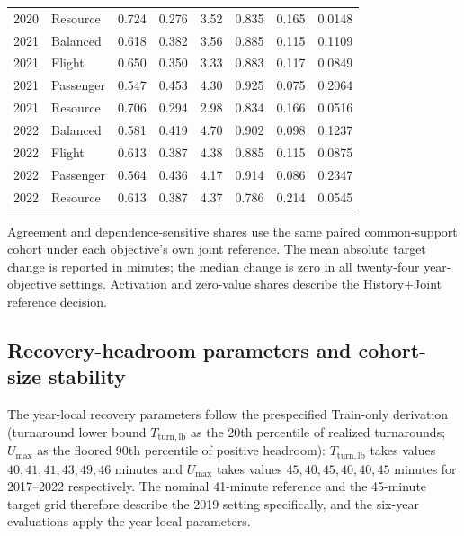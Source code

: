 \documentclass[10pt,a4paper]{article}
\numberwithin{equation}{section}
\begin{document}
\begin{table}[htbp]
\begin{tabular}{llrrrrrr}
2020 & Resource & 0.724 & 0.276 & 3.52 & 0.835 & 0.165 & 0.0148 \\
2021 & Balanced & 0.618 & 0.382 & 3.56 & 0.885 & 0.115 & 0.1109 \\
2021 & Flight & 0.650 & 0.350 & 3.33 & 0.883 & 0.117 & 0.0849 \\
2021 & Passenger & 0.547 & 0.453 & 4.30 & 0.925 & 0.075 & 0.2064 \\
2021 & Resource & 0.706 & 0.294 & 2.98 & 0.834 & 0.166 & 0.0516 \\
2022 & Balanced & 0.581 & 0.419 & 4.70 & 0.902 & 0.098 & 0.1237 \\
2022 & Flight & 0.613 & 0.387 & 4.38 & 0.885 & 0.115 & 0.0875 \\
2022 & Passenger & 0.564 & 0.436 & 4.17 & 0.914 & 0.086 & 0.2347 \\
2022 & Resource & 0.613 & 0.387 & 4.37 & 0.786 & 0.214 & 0.0545 \\
\bottomrule
\end{tabular}

\vspace{2pt}\parbox{.93\linewidth}{\scriptsize Agreement and dependence-sensitive shares use the same paired common-support cohort under each objective's own joint reference. The mean absolute target change is reported in minutes; the median change is zero in all twenty-four year-objective settings. Activation and zero-value shares describe the History+Joint reference decision.}
\end{table}

\subsection{Recovery-headroom parameters and cohort-size stability}
The year-local recovery parameters follow the prespecified Train-only derivation (turnaround lower bound $T_{\mathrm{turn,lb}}$ as the 20th percentile of realized turnarounds; $U_{\max}$ as the floored 90th percentile of positive headroom): $T_{\mathrm{turn,lb}}$ takes values $40,41,41,43,49,46$ minutes and $U_{\max}$ takes values $45,40,45,40,40,45$ minutes for 2017--2022 respectively. The nominal 41-minute reference and the 45-minute target grid therefore describe the 2019 setting specifically, and the six-year evaluations apply the year-local parameters.
\end{document}
